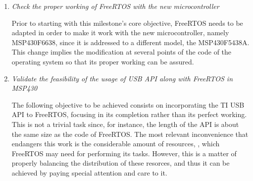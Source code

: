 		\begin{enumerate}
			\item \emph{Check the proper working of FreeRTOS with the new microcontroller}\\
				\begin{comment}
				Before to start the real objetive of this milestone we need to adapt the FreeRTOS main
				functionalities to the new MSP430, that been a new device was not actualy supported by. This mind
				the creation of a good number of new clases, most of them was excatly equal to their homonimes
				for the MSP430 5438A but other needs some little modifications.\\
				\end{comment}
				Prior to starting with this milestone's core objective, FreeRTOS needs to be adapted in order to
				make it work with the new microcontroller, namely MSP430F6638, since it is addressed to a
				different model, the MSP430F5438A. This change implies the modification at several points of the
				code of the operating system so that its proper working can be assured. 

			\item \emph{Validate the feasibility of the usage of USB API along with FreeRTOS in MSP430}\\
				\begin{comment}
				The next need in the milestone was port as soon as posible the TI USB API to a task-based SO like
				FreeRTOS whithout taking too much care about its correction. The introduction into the FreeRTOS
				was prety problematic because the size of just the the API was near to the size of the FreeRTOS.
				Plus, there are a very important risk, USB uses a important number of resources as pines or clock
				that can be also used by the FreeRTOS to another task, specially risky was the clock because both
				need a clock, but the selected board have 2 clock spots, and taking care in the port all this
				themes could resolved and everything works fine.\\
				\end{comment}
				The following objective to be achieved consists on incorporating the TI USB API to FreeRTOS,
				focusing in its completion rather than its perfect working. This is not a trivial task since, for
				instance, the length of the API is about the same size as the code of FreeRTOS. 
				The most relevant inconvenience that endangers this work is the considerable amount of resources,
				, which FreeRTOS may need for performing its tasks. However, this
				is a matter of properly balancing the distribution of these resorces, and thus it can be achieved
				by paying special attention and care to it.


\end{enumerate}
